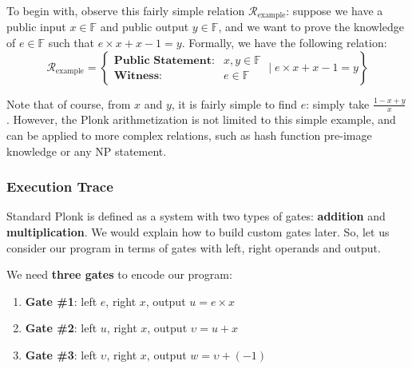 \documentclass[../lecture-notes-148x210.tex]{subfiles}
\begin{document}
\begin{example}
To begin with, observe this fairly simple relation
$\mathcal{R}_{\text{example}}$: suppose we have a public input $x \in
\mathbb{F}$ and public output $y \in \mathbb{F}$, and we want to prove the knowledge of $e \in
\mathbb{F}$ such that $e \times x + x - 1 = y$. Formally, we have the following relation:
\begin{equation*}
    \mathcal{R}_{\text{example}} = \left\{ \begin{matrix}
        \textbf{Public Statement:} & x, y \in \mathbb{F} \\
        \textbf{Witness}: & e \in \mathbb{F}
    \end{matrix} \; \Big| \; e \times x + x - 1 = y \right\}
\end{equation*}

\end{example}

\begin{remark}
    Note that of course, from $x$ and $y$, it is fairly simple to find $e$: simply take $\frac{1 - x + y}{x}$. However, the Plonk arithmetization 
    is not limited to this simple example, and can be applied to more complex relations, such as hash function pre-image knowledge or any NP statement.
\end{remark}

\subsubsection{Execution Trace}

Standard Plonk is defined as a system with two types of gates: \textbf{addition}
and \textbf{multiplication}. We would explain how to build custom gates later.
So, let us consider our program in terms of gates with left, right operands and
output. 

\begin{example}
    We need \textbf{three gates} to encode our program:
    \begin{enumerate}
        \item \textbf{Gate \#1}: left $e$, right $x$, output \(u = e \times x\)
        \item \textbf{Gate \#2}: left $u$, right $x$, output \(\upsilon = u + x\)
        \item \textbf{Gate \#3}: left $\upsilon$, right $x$, output \(w = \upsilon + (-1)\)
    \end{enumerate}
\end{example}
\end{document}
